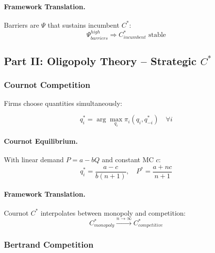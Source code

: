 \paragraph{Framework Translation.}
Barriers are $\Psi$ that sustains incumbent $C^*$:
\begin{equation}
\Psi_{barriers}^{high} \Rightarrow C^*_{incumbent} \text{ stable}
\end{equation}

\subsection{Part II: Oligopoly Theory – Strategic $C^*$}

\subsubsection{Cournot Competition}

Firms choose quantities simultaneously:

\begin{equation}
\boxed{
q_i^* = \arg\max_{q_i} \pi_i(q_i, q_{-i}^*) \quad \forall i
}
\label{eq:cournot}
\end{equation}

\paragraph{Cournot Equilibrium.}
With linear demand $P = a - bQ$ and constant MC $c$:
\begin{equation}
q_i^* = \frac{a - c}{b(n+1)}, \quad P^* = \frac{a + nc}{n+1}
\end{equation}

\paragraph{Framework Translation.}
Cournot $C^*$ interpolates between monopoly and competition:
\begin{equation}
C^*_{monopoly} \xrightarrow{n \to \infty} C^*_{competitive}
\end{equation}

\subsubsection{Bertrand Competition}

